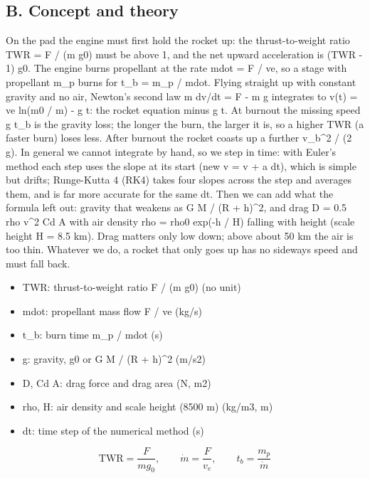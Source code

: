 \documentclass[11pt,a4paper]{article}
\begin{document}
\subsection*{B. Concept and theory}
On the pad the engine must first hold the rocket up: the thrust-to-weight ratio TWR = F / (m g0) must be above 1, and the net upward acceleration is (TWR - 1) g0. The engine burns propellant at the rate mdot = F / ve, so a stage with propellant m\_p burns for t\_b = m\_p / mdot. Flying straight up with constant gravity and no air, Newton's second law m dv/dt = F - m g integrates to v(t) = ve ln(m0 / m) - g t: the rocket equation minus g t. At burnout the missing speed g t\_b is the gravity loss; the longer the burn, the larger it is, so a higher TWR (a faster burn) loses less. After burnout the rocket coasts up a further v\_b\textasciicircum{}2 / (2 g). In general we cannot integrate by hand, so we step in time: with Euler's method each step uses the slope at its start (new v = v + a dt), which is simple but drifts; Runge-Kutta 4 (RK4) takes four slopes across the step and averages them, and is far more accurate for the same dt. Then we can add what the formula left out: gravity that weakens as G M / (R + h)\textasciicircum{}2, and drag D = 0.5 rho v\textasciicircum{}2 Cd A with air density rho = rho0 exp(-h / H) falling with height (scale height H = 8.5 km). Drag matters only low down; above about 50 km the air is too thin. Whatever we do, a rocket that only goes up has no sideways speed and must fall back.

\begin{itemize}[nosep]
\item TWR: thrust-to-weight ratio F / (m g0) (no unit)
\item mdot: propellant mass flow F / ve (kg/s)
\item t\_b: burn time m\_p / mdot (s)
\item g: gravity, g0 or G M / (R + h)\textasciicircum{}2 (m/s2)
\item D, Cd A: drag force and drag area (N, m2)
\item rho, H: air density and scale height (8500 m) (kg/m3, m)
\item dt: time step of the numerical method (s)
\end{itemize}

\begin{equation*}
\mathrm{TWR} = \frac{F}{m g_0},\qquad \dot m = \frac{F}{v_e},\qquad t_b = \frac{m_p}{\dot m}
\end{equation*}
\end{document}
